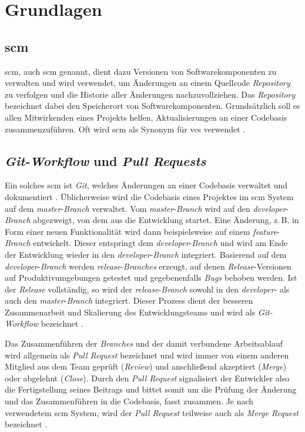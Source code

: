 \chapter{Grundlagen}
\label{chap:grundlagen}

\section{\acf{scm}}

\acl{scm}, auch \acs{scm} genannt, dient dazu Versionen von Softwarekomponenten zu verwalten und wird verwendet, um Änderungen an einem Quellcode \textit{Repository} zu verfolgen und die Historie aller Änderungen nachzuvollziehen. Das \textit{Repository} bezeichnet dabei den Speicherort von Softwarekomponenten. Grundsätzlich soll es allen Mitwirkenden eines Projekts helfen, Aktualisierungen an einer Codebasis zusammenzuführen. Oft wird \ac{scm} als Synonym für \ac{vcs} verwendet \citep{scm_atlassian}.

\section{\textit{Git-Workflow} und \textit{Pull Requests}}

Ein solches \ac{scm} ist \textit{Git}, welches Änderungen an einer Codebasis verwaltet und dokumentiert \citep{git}. Üblicherweise wird die Codebasis eines Projektes im \ac{scm} System auf dem \textit{master}-\textit{Branch} verwaltet. Vom \textit{master}-\textit{Branch} wird auf den \textit{developer}-\textit{Branch} abgezweigt, von dem aus die Entwicklung startet. Eine Änderung, z.\,B. in Form einer neuen Funktionalität wird dann beispielsweise auf einem \textit{feature}-\textit{Branch} entwickelt. Dieser entspringt dem \textit{developer}-\textit{Branch} und wird am Ende der Entwicklung wieder in den \textit{developer}-\textit{Branch} integriert. Basierend auf dem \textit{developer}-\textit{Branch} werden \textit{release}-\textit{Branches} erzeugt, auf denen \textit{Release}-Versionen auf Produktivumgebungen getestet und gegebenenfalls \textit{Bugs} behoben werden. Ist der \textit{Release} vollständig, so wird der \textit{release}-\textit{Branch} sowohl in den \textit{developer}- als auch den \textit{master}-\textit{Branch} integriert. Dieser Prozess dient der besseren Zusammenarbeit und Skalierung des Entwicklungsteams und wird als \textit{Git-Workflow} bezeichnet \citep{git_workflow_atlassian}. 

Das Zusammenführen der \textit{Branches} und der damit verbundene Arbeitsablauf wird allgemein als \textit{Pull Request} bezeichnet und wird immer von einem anderen Mitglied aus dem Team geprüft (\textit{Review}) und anschließend akzeptiert (\textit{Merge}) oder abgelehnt (\textit{Close}). Durch den \textit{Pull Request} signalisiert der Entwickler also die Fertigstellung seines Beitrags und bittet somit um die Prüfung der Änderung und das Zusammenführen in die Codebasis, fasst \citet{fowler_2021} zusammen. Je nach verwendetem \ac{scm} System, wird der \textit{Pull Request} teilweise auch als \textit{Merge Request} bezeichnet \citep{fowler_2021}.

